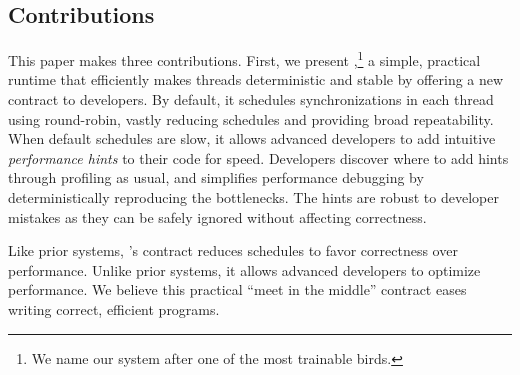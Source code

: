


\subsection{Contributions}

This paper makes three contributions.
First, we present \xxx,\footnote{We name our system after one of the most
  trainable birds.} a simple, practical runtime that efficiently makes
threads deterministic and stable by offering a new contract to developers.
By default, it schedules synchronizations in each thread using
round-robin, vastly reducing schedules and providing broad repeatability.
When default schedules are slow, it allows advanced developers to add
intuitive \emph{performance hints} to their code for speed.  Developers discover
where to add hints through profiling as usual, and \xxx simplifies
performance debugging by deterministically reproducing the bottlenecks.
The hints are robust to developer mistakes as they can be safely ignored
without affecting correctness.

Like prior systems, \xxx's contract reduces schedules to favor correctness over performance.  Unlike prior systems, it allows advanced developers
to optimize performance.  We believe this practical ``meet in the
middle'' contract eases writing correct, efficient programs.

